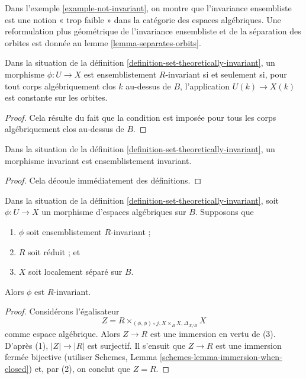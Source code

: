 \noindent
Dans
l'exemple \ref{example-not-invariant},
on montre que l'invariance ensembliste est une notion « trop faible » dans
la catégorie des espaces algébriques. Une reformulation plus géométrique
de l'invariance ensembliste et de la séparation des orbites est donnée au
lemme \ref{lemma-separates-orbits}.

\begin{lemma}
\label{lemma-set-theoretic-invariant}
Dans la situation de la définition \ref{definition-set-theoretically-invariant},
un morphisme $\phi : U \to X$ est ensemblistement $R$-invariant si et
seulement si, pour tout corps algébriquement clos $k$ au-dessus de $B$, l'application
$U(k) \to X(k)$ est constante sur les orbites.
\end{lemma}

\begin{proof}
Cela résulte du fait que la condition est imposée pour tous les corps
algébriquement clos au-dessus de $B$.
\end{proof}

\begin{lemma}
\label{lemma-invariant-set-theoretically-invariant}
Dans la situation de la définition \ref{definition-set-theoretically-invariant},
un morphisme invariant est ensemblistement invariant.
\end{lemma}

\begin{proof}
Cela découle immédiatement des définitions.
\end{proof}

\begin{lemma}
\label{lemma-set-theoretically-invariant-invariant-when-reduced}
Dans la situation de la définition \ref{definition-set-theoretically-invariant},
soit $\phi : U \to X$ un morphisme d'espaces algébriques sur $B$.
Supposons que
\begin{enumerate}
\item $\phi$ soit ensemblistement $R$-invariant ;
\item $R$ soit réduit ; et
\item $X$ soit localement séparé sur $B$.
\end{enumerate}
Alors $\phi$ est $R$-invariant.
\end{lemma}

\begin{proof}
Considérons l'égalisateur
$$
Z = R \times_{(\phi, \phi) \circ j, X \times_B X, \Delta_{X/B}} X
$$
comme espace algébrique. Alors $Z \to R$ est une immersion en vertu de (3).
D'après (1), $|Z| \to |R|$ est surjectif. Il s'ensuit que
$Z \to R$ est une immersion fermée bijective (utiliser
Schemes, Lemma \ref{schemes-lemma-immersion-when-closed})
et, par (2), on conclut que $Z = R$.
\end{proof}

